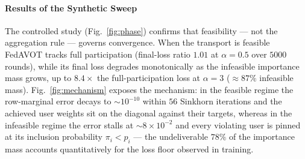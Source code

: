 \paragraph{Results of the Synthetic Sweep}
The controlled study (Fig.~\ref{fig:phase}) confirms that feasibility — not
the aggregation rule — governs convergence. When the transport is feasible
FedAVOT tracks full participation (final-loss ratio $1.01$ at $\alpha=0.5$
over $5000$ rounds), while its final loss degrades monotonically as the
infeasible importance mass grows, up to $8.4\times$ the full-participation
loss at $\alpha=3$ (${\approx}87\%$ infeasible mass).
Fig.~\ref{fig:mechanism} exposes the mechanism: in the feasible regime the
row-marginal error decays to ${\sim}10^{-10}$ within $56$ Sinkhorn
iterations and the achieved user weights sit on the diagonal against their
targets, whereas in the infeasible regime the error stalls at
${\sim}8\times10^{-2}$ and every violating user is pinned at its inclusion
probability $\pi_i < p_i$ — the undeliverable $78\%$ of the importance
mass accounts quantitatively for the loss floor observed in training.


